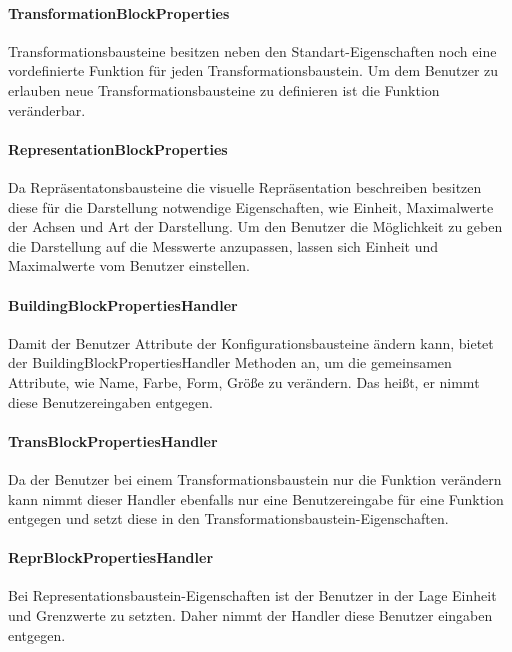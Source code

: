 \documentclass[parskip=full]{scrartcl}
\begin{document}
\paragraph{TransformationBlockProperties}

Transformationsbausteine besitzen neben den Standart-Eigenschaften noch eine vordefinierte Funktion für jeden Transformationsbaustein. Um dem Benutzer zu erlauben neue Transformationsbausteine zu definieren ist die Funktion veränderbar.

\paragraph{RepresentationBlockProperties}

Da Repräsentatonsbausteine die visuelle Repräsentation beschreiben besitzen diese für die Darstellung notwendige Eigenschaften, wie Einheit, Maximalwerte der Achsen und Art der Darstellung. Um den Benutzer die Möglichkeit zu geben die Darstellung auf die Messwerte anzupassen, lassen sich Einheit und Maximalwerte vom Benutzer einstellen.

\paragraph{BuildingBlockPropertiesHandler}

Damit der Benutzer Attribute der Konfigurationsbausteine ändern kann, bietet der BuildingBlockPropertiesHandler Methoden an, um die gemeinsamen Attribute, wie Name, Farbe, Form, Größe zu verändern. Das heißt, er nimmt diese Benutzereingaben entgegen.

\paragraph{TransBlockPropertiesHandler}

Da der Benutzer bei einem Transformationsbaustein nur die Funktion verändern kann nimmt dieser Handler ebenfalls nur eine Benutzereingabe für eine Funktion entgegen und setzt diese in den Transformationsbaustein-Eigenschaften.

\paragraph{ReprBlockPropertiesHandler}

Bei Representationsbaustein-Eigenschaften ist der Benutzer in der Lage Einheit und Grenzwerte zu setzten. Daher nimmt der Handler diese Benutzer eingaben entgegen.
\end{document}
